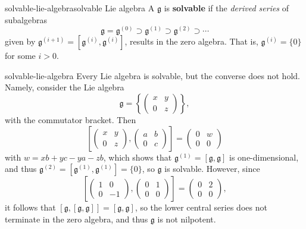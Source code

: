 \begin{topic}{solvable-lie-algebra}{solvable Lie algebra}
    A  $\mathfrak{g}$ is \textbf{solvable} if the \textit{derived series} of subalgebras
    \[ \mathfrak{g} = \mathfrak{g}^{(0)} \supset \mathfrak{g}^{(1)} \supset \mathfrak{g}^{(2)} \supset \cdots \]
    given by $\mathfrak{g}^{(i + 1)} = [\mathfrak{g}^{(i)}, \mathfrak{g}^{(i)}]$, results in the zero algebra. That is, $\mathfrak{g}^{(i)} = \{ 0 \}$ for some $i > 0$.
\end{topic}

\begin{example}{solvable-lie-algebra}
    Every  Lie algebra is solvable, but the converse does not hold. Namely, consider the Lie algebra
    \[ \mathfrak{g} = \left\{ \begin{pmatrix} x & y \\ 0 & z \end{pmatrix} \right\} , \]
    with the commutator bracket. Then
    \[ \left[ \begin{pmatrix} x & y \\ 0 & z \end{pmatrix}, \begin{pmatrix} a & b \\ 0 & c \end{pmatrix} \right] = \begin{pmatrix} 0 & w \\ 0 & 0 \end{pmatrix} \]
    with $w = xb + yc - ya - zb$, which shows that $\mathfrak{g}^{(1)} = [\mathfrak{g}, \mathfrak{g}]$ is one-dimensional, and thus $\mathfrak{g}^{(2)} = [\mathfrak{g}^{(1)}, \mathfrak{g}^{(1)}] = \{ 0 \}$, so $\mathfrak{g}$ is solvable. However, since
    \[ \left[ \begin{pmatrix} 1 & 0 \\ 0 & -1 \end{pmatrix}, \begin{pmatrix} 0 & 1 \\ 0 & 0 \end{pmatrix} \right] = \begin{pmatrix} 0 & 2 \\ 0 & 0 \end{pmatrix} , \]
    it follows that $[\mathfrak{g}, [\mathfrak{g}, \mathfrak{g}]] = [\mathfrak{g}, \mathfrak{g}]$, so the lower central series does not terminate in the zero algebra, and thus $\mathfrak{g}$ is not nilpotent.
\end{example}

